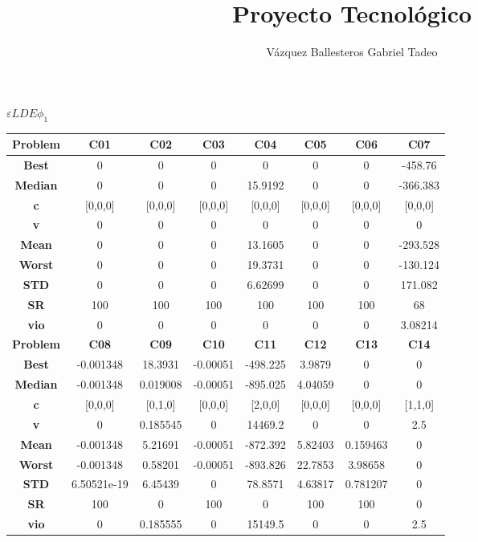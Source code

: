 \documentclass{IEEEtran}
\title{Proyecto Tecnológico}
\author{Vázquez Ballesteros Gabriel Tadeo}
\begin{document}
\onecolumn

\begin{center}
$\varepsilon LDE \phi_1$\\
  \begin{tabular}{|c|c|c|c|c|c|c|c|}
    \hline 
    \textbf{Problem} & \textbf{C01} & \textbf{C02} & \textbf{C03} & \textbf{C04} & \textbf{C05} & \textbf{C06} & \textbf{C07} \\ 
    \hline\hline 
    \textbf{Best} & 0 & 0 & 0 & 0 & 0 & 0 & -458.76\\ 
    \textbf{Median} & 0 & 0 & 0 & 15.9192 & 0 & 0 & -366.383\\ 
    \textbf{c} & [0,0,0] & [0,0,0] & [0,0,0] & [0,0,0] & [0,0,0] & [0,0,0] & [0,0,0]\\ 
    \textbf{v} & 0 & 0 & 0 & 0 & 0 & 0 & 0\\ 
    \textbf{Mean} & 0 & 0 & 0 & 13.1605 & 0 & 0 & -293.528\\ 
    \textbf{Worst} & 0 & 0 & 0 & 19.3731 & 0 & 0 & -130.124\\ 
    \textbf{STD} & 0 & 0 & 0 & 6.62699 & 0 & 0 & 171.082\\ 
    \textbf{SR} & 100 & 100 & 100 & 100 & 100 & 100 & 68\\ 
    \textbf{vio} & 0 & 0 & 0 & 0 & 0 & 0 & 3.08214\\ 
    \hline 
    \hline 
    \textbf{Problem} & \textbf{C08} & \textbf{C09} & \textbf{C10} & \textbf{C11} & \textbf{C12} & \textbf{C13} & \textbf{C14} \\ 
    \hline\hline 
    \textbf{Best} & -0.001348 & 18.3931 & -0.00051 & -498.225 & 3.9879 & 0 & 0\\ 
    \textbf{Median} & -0.001348 & 0.019008 & -0.00051 & -895.025 & 4.04059 & 0 & 0\\ 
    \textbf{c} & [0,0,0] & [0,1,0] & [0,0,0] & [2,0,0] & [0,0,0] & [0,0,0] & [1,1,0]\\ 
    \textbf{v} & 0 & 0.185545 & 0 & 14469.2 & 0 & 0 & 2.5\\ 
    \textbf{Mean} & -0.001348 & 5.21691 & -0.00051 & -872.392 & 5.82403 & 0.159463 & 0\\ 
    \textbf{Worst} & -0.001348 & 0.58201 & -0.00051 & -893.826 & 22.7853 & 3.98658 & 0\\ 
    \textbf{STD} & 6.50521e-19 & 6.45439 & 0 & 78.8571 & 4.63817 & 0.781207 & 0\\ 
    \textbf{SR} & 100 & 0 & 100 & 0 & 100 & 100 & 0\\ 
    \textbf{vio} & 0 & 0.185555 & 0 & 15149.5 & 0 & 0 & 2.5\\ 

\end{tabular}
\end{center}
\end{document}
